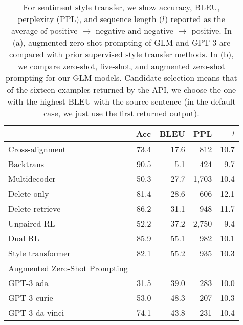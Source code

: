 \begin{table}
\caption{
For sentiment style transfer, we show accuracy, BLEU, perplexity (PPL), and sequence length ($l$) reported as the average of positive $\rightarrow$ negative and negative $\rightarrow$ positive. 
In (a), augmented zero-shot prompting of GLM and GPT-3 are compared with prior supervised style transfer methods.
In (b), we compare zero-shot, five-shot, and augmented zero-shot prompting for our GLM models. 
Candidate selection means that of the sixteen examples returned by the API, we choose the one with the highest BLEU with the source sentence (in the default case, we just use the first returned output).  
}
    \setlength{\tabcolsep}{2pt}
    \begin{subtable}{.58\linewidth}
    \centering \small 
        \begin{tabular}{l r r r r}
        \toprule
         & Acc & BLEU & PPL & $l$\\
        \midrule
        Cross-alignment \citep{NIPS2017_2d2c8394} & 73.4 & 17.6 & 812 & 10.7 \\
        Backtrans \citep{prabhumoye-etal-2018-style} & 90.5 & 5.1 & 424 & 9.7 \\
        Multidecoder \citep{AAAI1817015}  & 50.3 & 27.7 & 1,703 & 10.4 \\
        Delete-only \citep{li-etal-2018-delete} & 81.4 & 28.6 & 606 & 12.1 \\
        Delete-retrieve \citep{li-etal-2018-delete} & 86.2 & 31.1 & 948 & 11.7 \\
        Unpaired RL \citep{xu-etal-2018-unpaired} & 52.2 & 37.2 & 2,750 & 9.4 \\
        Dual RL \citep{DBLP:conf/ijcai/LuoLZYCSS19} & 85.9 & 55.1 & 982 & 10.1 \\
        Style transformer \citep{dai-etal-2019-style} & 82.1 & 55.2 & 935 & 10.3 \\
        \midrule
        \underline{Augmented Zero-Shot Prompting} \\
        GPT-3 ada & 31.5 & 39.0 & 283 & 10.0 \\
        GPT-3 curie  & 53.0 & 48.3 & 207 & 10.3 \\
        GPT-3 da vinci  & 74.1 & 43.8 & 231 & 10.4 \\

\end{tabular}
\end{subtable}
\end{table}
